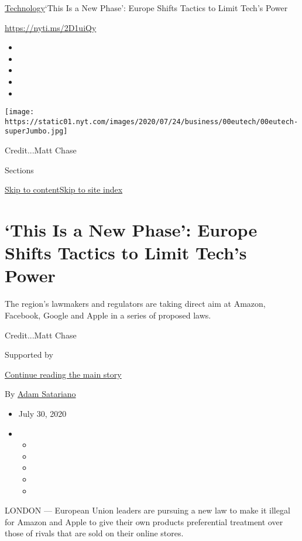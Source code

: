 \href{/section/technology}{Technology}\textbar{}`This Is a New Phase':
Europe Shifts Tactics to Limit Tech's Power

\url{https://nyti.ms/2D1uiQy}

\begin{itemize}
\item
\item
\item
\item
\item
\end{itemize}

\texttt{[image: https://static01.nyt.com/images/2020/07/24/business/00eutech/00eutech-superJumbo.jpg]}

Credit...Matt Chase

Sections

\protect\hyperlink{site-content}{Skip to
content}\protect\hyperlink{site-index}{Skip to site index}

\hypertarget{this-is-a-new-phase-europe-shifts-tactics-to-limit-techs-power}{%
\section{`This Is a New Phase': Europe Shifts Tactics to Limit Tech's
Power}\label{this-is-a-new-phase-europe-shifts-tactics-to-limit-techs-power}}

The region's lawmakers and regulators are taking direct aim at Amazon,
Facebook, Google and Apple in a series of proposed laws.

Credit...Matt Chase

Supported by

\protect\hyperlink{after-sponsor}{Continue reading the main story}

By \href{https://www.nytimes.com/by/adam-satariano}{Adam Satariano}

\begin{itemize}
\item
  July 30, 2020
\item
  \begin{itemize}
  \item
  \item
  \item
  \item
  \item
  \end{itemize}
\end{itemize}

LONDON --- European Union leaders are pursuing a new law to make it
illegal for Amazon and Apple to give their own products preferential
treatment over those of rivals that are sold on their online stores.

